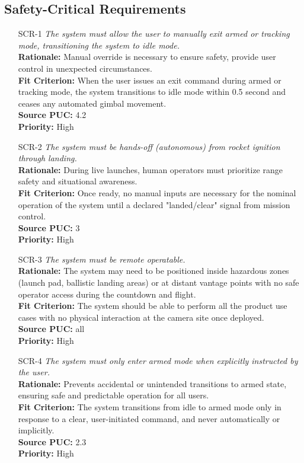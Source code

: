 \documentclass[12pt]{article}
\begin{document}
\subsection{Safety-Critical Requirements}
\begin{itemize}[leftmargin=*]
  \item[SCR-1] \emph{The system must allow the user to manually exit armed or tracking
          mode, transitioning the system to idle mode.}\\[2mm]
        \textbf{Rationale:} Manual override is necessary to ensure safety, provide user control in unexpected circumstances.\\
        \textbf{Fit Criterion:} When the user issues an exit command during armed or tracking mode, the system transitions to idle mode within 0.5 second and ceases any automated gimbal movement.\\
        \textbf{Source PUC:} 4.2 \\
        \textbf{Priority:} High

  \item[SCR-2] \emph{The system must be hands-off (autonomous) from rocket ignition
          through landing.}\\[2mm]
        \textbf{Rationale:} During live launches, human operators must prioritize range safety and situational awareness.\\
        \textbf{Fit Criterion:} Once ready, no manual inputs are necessary for the nominal operation of the system until a declared "landed/clear" signal from mission control.\\
        \textbf{Source PUC:} 3 \\
        \textbf{Priority:} High

  \item[SCR-3] \emph{The system must be remote operatable.}\\[2mm]
        \textbf{Rationale:} The system may need to be positioned inside hazardous zones (launch pad, ballistic landing areas) or at distant vantage points with no safe operator access during the countdown and flight.\\
        \textbf{Fit Criterion:} The system should be able to perform all the product use cases with no physical interaction at the camera site once deployed.\\
        \textbf{Source PUC:} all \\
        \textbf{Priority:} High

  \item[SCR-4] \emph{The system must only enter armed mode when explicitly instructed
          by the user.}\\[2mm]
        \textbf{Rationale:} Prevents accidental or unintended transitions to armed state, ensuring safe and predictable operation for all users.\\
        \textbf{Fit Criterion:} The system transitions from idle to armed mode only in response to a clear, user-initiated command, and never automatically or implicitly.\\
        \textbf{Source PUC:} 2.3 \\
        \textbf{Priority:} High
\end{itemize}
\end{document}
